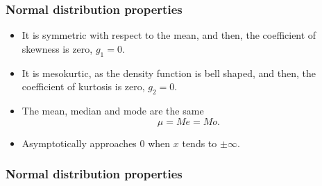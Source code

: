 \begin{frame}
\frametitle{Normal distribution properties}
\begin{itemize}
\item It is symmetric with respect to the mean, and then, the coefficient of skewness is zero,
$g_1=0$.
\item It is mesokurtic, as the density function is bell shaped, and then, the coefficient of kurtosis is zero, $g_2=0$.
\item The mean, median and mode are the same
\[
\mu = Me = Mo.
\]
\item Asymptotically approaches 0 when $x$ tends to $\pm \infty$.
\end{itemize}
\end{frame}


\begin{frame}
\frametitle{Normal distribution properties}
\begin{center}
\\
\\
\end{center}

\begin{center}
\end{center}
\end{frame}


